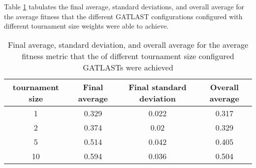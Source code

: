 Table \ref{tab:HP:GA:tournamentSize:average fitness} tabulates the final average, standard deviations, and overall average for the average fitness that the different GATLAST configurations configured with different tournament size weights were able to achieve.
\begin{table}[tbh!]
\centering
\begin{adjustbox}{trim=0cm 0cm 0cm 0cm, clip=true}
\begin{tabular}{|c|c|c|c|}
\hline
tournament size & Final average & Final standard deviation & Overall average\\
\hline
1 & 0.329 & 0.022 & 0.317\\\hline
2 & 0.374 & 0.02 & 0.329\\\hline
5 & 0.514 & 0.042 & 0.405\\\hline
10 & 0.594 & 0.036 & 0.504\\\hline
\end{tabular}
\end{adjustbox}
\caption{Final average, standard deviation, and overall average for the average fitness metric that the of different tournament size configured GATLASTs were achieved}
\label{tab:HP:GA:tournamentSize:average fitness}
\end{table}